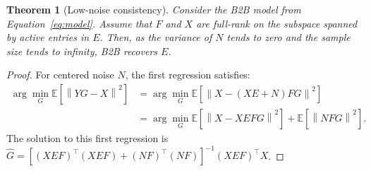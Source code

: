 \documentclass{article}
\newtheorem{theorem}{Theorem}
\begin{document}
\begin{theorem}[Low-noise consistency]
    Consider the B2B model from Equation~\ref{eq:model}.
    Assume that $F$ and $X$ are full-rank on the subspace spanned by active entries in $E$.
    Then, as the variance of $N$ tends to zero and the sample size tends to infinity, B2B recovers $E$.
\end{theorem}
\begin{proof}
For centered noise $N$, the first regression satisfies:
\begin{align*}
    \arg \min_G \mathbb{E}[\left \| YG - X \right \|^2] &=   \arg \min_G \mathbb{E}[\left \| X - (XE + N)FG \right\|^2]\\
                                                        &{}= \arg \min_G \mathbb{E}[\left \| X - XEFG\right\| ^2]  + \mathbb{E}[\left \| NFG\right \| ^2].
\end{align*}
%
The solution to this first regression is $\hat{G} = [(XEF)^\top (XEF) + (NF)^\top (NF)]^{-1} (XEF)^\top X$.


\end{proof}
\end{document}
